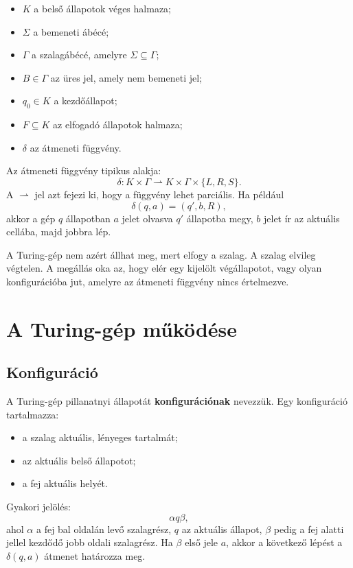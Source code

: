 \begin{itemize}
  \item $K$ a belső állapotok véges halmaza;
  \item $\Sigma$ a bemeneti ábécé;
  \item $\Gamma$ a szalagábécé, amelyre $\Sigma\subseteq\Gamma$;
  \item $B\in\Gamma$ az üres jel, amely nem bemeneti jel;
  \item $q_0\in K$ a kezdőállapot;
  \item $F\subseteq K$ az elfogadó állapotok halmaza;
  \item $\delta$ az átmeneti függvény.
\end{itemize}

Az átmeneti függvény tipikus alakja:
\[
  \delta:K\times\Gamma \rightharpoonup K\times\Gamma\times\{L,R,S\}.
\]
A $\rightharpoonup$ jel azt fejezi ki, hogy a függvény lehet parciális. Ha például
\[
  \delta(q,a)=(q',b,R),
\]
akkor a gép $q$ állapotban $a$ jelet olvasva $q'$ állapotba megy, $b$ jelet ír az aktuális cellába, majd jobbra lép.

\begin{warningbox}
A Turing-gép nem azért állhat meg, mert elfogy a szalag. A szalag elvileg végtelen. A megállás oka az, hogy elér egy kijelölt végállapotot, vagy olyan konfigurációba jut, amelyre az átmeneti függvény nincs értelmezve.
\end{warningbox}

\section{A Turing-gép működése}

\subsection{Konfiguráció}

A Turing-gép pillanatnyi állapotát \textbf{konfigurációnak} nevezzük. Egy konfiguráció tartalmazza:

\begin{itemize}
  \item a szalag aktuális, lényeges tartalmát;
  \item az aktuális belső állapotot;
  \item a fej aktuális helyét.
\end{itemize}

Gyakori jelölés:
\[
  \alpha q \beta,
\]
ahol $\alpha$ a fej bal oldalán levő szalagrész, $q$ az aktuális állapot, $\beta$ pedig a fej alatti jellel kezdődő jobb oldali szalagrész. Ha $\beta$ első jele $a$, akkor a következő lépést a $\delta(q,a)$ átmenet határozza meg.

